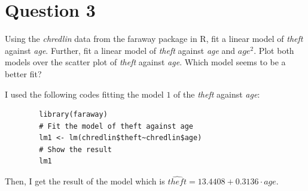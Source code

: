 \section{Question 3}

\begin{question}
    Using the \textit{chredlin} data from the faraway package in R, fit a linear model of \textit{theft} against \textit{age}. Further, fit a linear model of \textit{theft} against \textit{age} and $\textit{{age}}^2$. Plot both models over the scatter plot of \textit{theft} against \textit{age}. Which model seems to be a better fit?
\end{question}

\begin{answer}
    I used the following codes fitting the model $1$ of the \textit{theft} against \textit{age}:
    \begin{verbatim}
        library(faraway)
        # Fit the model of theft against age
        lm1 <- lm(chredlin$theft~chredlin$age)
        # Show the result
        lm1
    \end{verbatim}
    Then, I get the result of the model which is $\widehat{theft} = 13.4408 + 0.3136 \cdot age$.
    

\end{answer}
